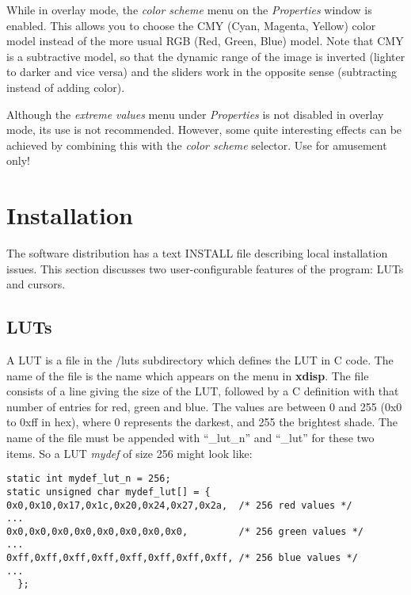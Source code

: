 While in overlay mode, the {\it color scheme\/} menu on the {\it Properties\/} window is enabled. This allows you to choose the CMY (Cyan, Magenta, Yellow) color model instead of the more usual RGB (Red, Green, Blue) model. Note that CMY is a subtractive model, so that the dynamic range of the image is inverted (lighter to darker and vice versa) and the sliders work in the opposite sense (subtracting instead of adding color).

Although the {\it extreme values\/} menu under {\it Properties\/} is not disabled in overlay mode, its use is not recommended. However, some quite interesting effects can be achieved by combining this with the {\it color scheme\/} selector. Use for amusement only!

\section{Installation}
The software distribution has a text INSTALL file describing local installation issues. This section discusses two user-configurable features of the program: LUTs and cursors.

\subsection{LUTs}
A LUT is a file in the /luts subdirectory which defines the LUT in C code. The name of the file is the name which appears on the menu in {\bf xdisp}. The file consists of a line giving the size of the LUT, followed by a C definition with that number of entries for red, green and blue. The values are between 0 and 255 (0x0 to 0xff in hex), where 0 represents the darkest, and 255 the brightest shade.
The name of the file must be appended with ``\_lut\_n'' and ``\_lut'' for these two items.
So a LUT {\it mydef\/} of size 256 might look like:
\begin{verbatim}
static int mydef_lut_n = 256;
static unsigned char mydef_lut[] = {
0x0,0x10,0x17,0x1c,0x20,0x24,0x27,0x2a,  /* 256 red values */
...
0x0,0x0,0x0,0x0,0x0,0x0,0x0,0x0,         /* 256 green values */
...
0xff,0xff,0xff,0xff,0xff,0xff,0xff,0xff, /* 256 blue values */
...
  };
\end{verbatim}
